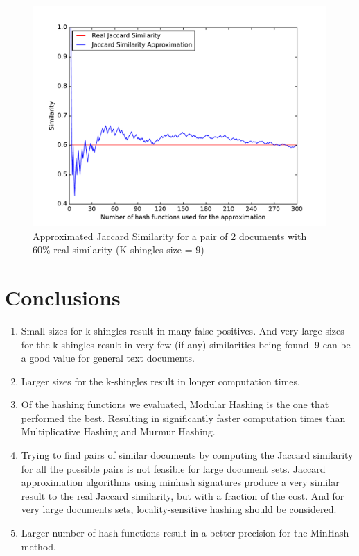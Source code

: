 \documentclass[12pt]{article}
\begin{document}
{\begin{figure}[H]
	\centering
	\includegraphics[scale=0.55]{graphs/JaccardSimilarityVsApproximation.pdf}
	\caption{Approximated Jaccard Similarity for a pair of 2 documents with 60\% real similarity (K-shingles size = 9)}
	\label{fig:JaccardVsApprox}
\end{figure}

\clearpage
\section{Conclusions}

\begin{enumerate}
\item Small sizes for k-shingles result in many false positives. And very large sizes for the k-shingles result in very few (if any) similarities being found. 9 can be a good value for general text documents.
\item Larger sizes for the k-shingles result in longer computation times.
\item Of the hashing functions we evaluated, Modular Hashing is the one that performed the best. Resulting in significantly faster computation times than Multiplicative Hashing and Murmur Hashing.
\item Trying to find pairs of similar documents by computing the Jaccard similarity for all the possible pairs is not feasible for large document sets. Jaccard approximation algorithms using minhash signatures produce a very similar result to the real Jaccard similarity, but with a fraction of the cost. And for very large documents sets, locality-sensitive hashing should be considered.
\item Larger number of hash functions result in a better precision for the MinHash method.


\end{enumerate}}
\end{document}
